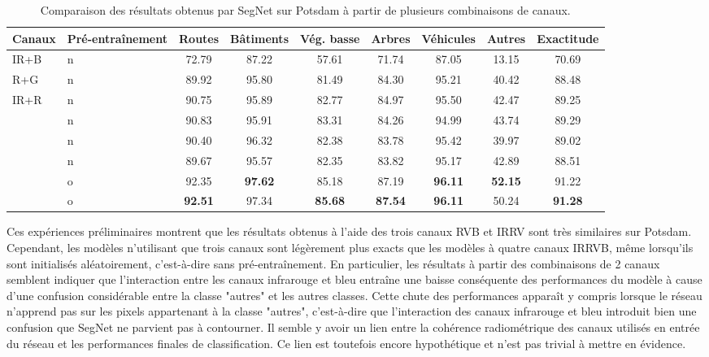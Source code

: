 \begin{table}
  \setlength\tabcolsep{3pt}
  \caption{Comparaison des résultats obtenus par SegNet sur Potsdam à partir de plusieurs combinaisons de canaux.}
  \label{tab:comparaison_bandes}
  \begin{tabularx}{\textwidth}{Y Y c c c c c c c}
    \toprule
    Canaux & Pré-entraînement & Routes & Bâtiments & Vég. basse & Arbres & Véhicules & Autres & Exactitude\\
    \midrule
    IR+B & n & 72.79 & 87.22 & 57.61 & 71.74 & 87.05 & 13.15 & 70.69\\
    R+G & n & 89.92 & 95.80 & 81.49 & 84.30 & 95.21 & 40.42 & 88.48\\
    IR+R & n & 90.75 & 95.89 & 82.77 & 84.97 & 95.50 & 42.47 & 89.25\\
     & n & 90.83 & 95.91 & 83.31 & 84.26 & 94.99 & 43.74 & 89.29\\
     & n & 90.40 & 96.32 & 82.38 & 83.78 & 95.42 & 39.97 & 89.02\\
     & n & 89.67 & 95.57 & 82.35 & 83.82 & 95.17 & 42.89 & 88.51\\
     & o & 92.35 & \textbf{97.62} & 85.18 & 87.19 & \textbf{96.11} & \textbf{52.15} & 91.22\\
     & o & \textbf{92.51} & 97.34 & \textbf{85.68} & \textbf{87.54} & \textbf{96.11} & 50.24 & \textbf{91.28}\\
    \bottomrule
  \end{tabularx}
\end{table}

Ces expériences préliminaires montrent que les résultats obtenus à l'aide des trois canaux \gls{RVB} et \gls{IRRV} sont très similaires sur Potsdam. Cependant, les modèles n'utilisant que trois canaux sont légèrement plus exacts que les modèles à quatre canaux \gls{IRRVB}, même lorsqu'ils sont initialisés aléatoirement, c'est-à-dire sans pré-entraînement. En particulier, les résultats à partir des combinaisons de 2 canaux semblent indiquer que l'interaction entre les canaux infrarouge et bleu entraîne une baisse conséquente des performances du modèle à cause d'une confusion considérable entre la classe "autres" et les autres classes. Cette chute des performances apparaît y compris lorsque le réseau n'apprend pas sur les pixels appartenant à la classe "autres", c'est-à-dire que l'interaction des canaux infrarouge et bleu introduit bien une confusion que SegNet ne parvient pas à contourner. Il semble y avoir un lien entre la cohérence radiométrique des canaux utilisés en entrée du réseau et les performances finales de classification. Ce lien est toutefois encore hypothétique et n'est pas trivial à mettre en évidence.

